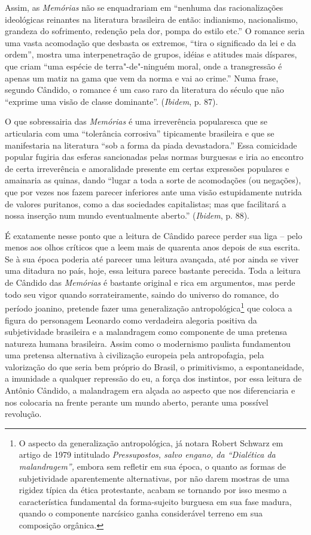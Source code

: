 {Assim, as \emph{Memórias} não se enquadrariam em ``nenhuma das
racionalizações ideológicas reinantes na literatura brasileira de então:
indianismo, nacionalismo, grandeza do sofrimento, redenção pela dor,
pompa do estilo etc.'' O romance seria uma vasta acomodação que desbasta
os extremos, ``tira o significado da lei e da ordem'', mostra uma
interpenetração de grupos, idéias e atitudes mais díspares, que criam
``uma espécie de terra"-de"-ninguém moral, onde a transgressão é apenas um
matiz na gama que vem da norma e vai ao crime.'' Numa frase, segundo
Cândido, o romance é um caso raro da literatura do século  que não
``exprime uma visão de classe dominante''. (\emph{Ibidem}, p. 87).

O que sobressairia das \emph{Memórias} é uma irreverência popularesca
que se articularia com uma ``tolerância corrosiva'' tipicamente
brasileira e que se manifestaria na literatura ``sob a forma da piada
devastadora.'' Essa comicidade popular fugiria das esferas sancionadas
pelas normas burguesas e iria ao encontro de certa irreverência e
amoralidade presente em certas expressões populares e amainaria as
quinas, dando ``lugar a toda a sorte de acomodações (ou negações), que
por vezes nos fazem parecer inferiores ante uma visão estupidamente
nutrida de valores puritanos, como a das sociedades capitalistas; mas
que facilitará a nossa inserção num mundo eventualmente aberto.''
(\emph{Ibidem}, p. 88).

É exatamente nesse ponto que a leitura de Cândido parece perder sua liga
-- pelo menos aos olhos críticos que a leem mais de quarenta anos depois
de sua escrita. Se à sua época poderia até parecer uma leitura avançada,
até por ainda se viver uma ditadura no país, hoje, essa leitura parece
bastante perecida. Toda a leitura de Cândido das \emph{Memórias} é
bastante original e rica em argumentos, mas perde todo seu vigor quando
sorrateiramente, saindo do universo do romance, do período joanino,
pretende fazer uma generalização antropológica\footnote{O aspecto da
  generalização antropológica, já notara Robert Schwarz em artigo de
  1979 intitulado \emph{Pressupostos, salvo engano, da ``Dialética da
  malandragem'',} embora sem refletir em sua época, o quanto as formas
  de subjetividade aparentemente alternativas, por não darem mostras de
  uma rigidez típica da ética protestante,  acabam se tornando por isso
  mesmo a característica fundamental da forma-sujeito burguesa em sua
  fase madura, quando o componente narcísico ganha considerável terreno em
  sua composição orgânica.} que coloca a figura do personagem Leonardo
como verdadeira alegoria positiva da subjetividade brasileira e a
malandragem como componente de uma pretensa natureza humana brasileira.
Assim como o modernismo paulista fundamentou uma pretensa alternativa à
civilização europeia pela antropofagia, pela valorização do que seria
bem próprio do Brasil, o primitivismo, a espontaneidade, a imunidade a
qualquer repressão do eu, a força dos instintos, por essa leitura de
Antônio Cândido, a malandragem era alçada ao aspecto que nos
diferenciaria e nos colocaria na frente perante um mundo aberto, perante
uma possível revolução.

}
